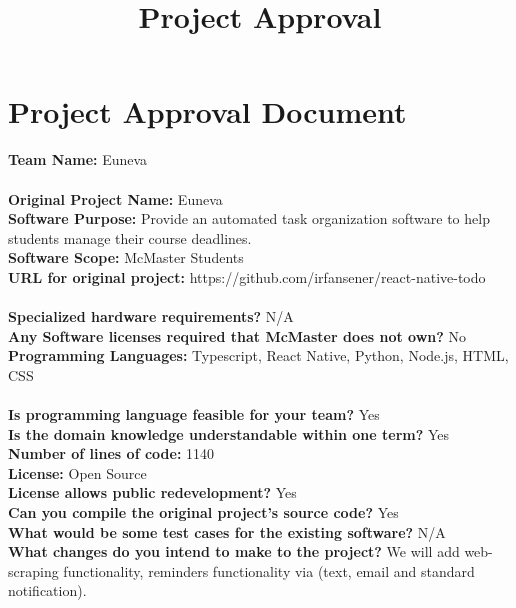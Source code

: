 \documentclass[11pt, oneside]{article}   	%
\title{Project Approval}
\author{}
\begin{document}
\marginpar{}
\section*{Project Approval Document}
\textbf{Team Name:} Euneva\\
\\
\textbf{Original Project Name:} Euneva\\
\textbf{Software Purpose:} Provide an automated task organization software to help students manage their course deadlines.\\
\textbf{Software Scope:} McMaster Students\\
\textbf{URL for original project:} https://github.com/irfansener/react-native-todo\\
\\
\textbf{Specialized hardware requirements?} N/A\\
\textbf{Any Software licenses required that McMaster does not own?} No\\
\textbf{Programming Languages:} Typescript, React Native, Python, Node.js, HTML, CSS\\
\\
\textbf{Is programming language feasible for your team?} Yes\\
\textbf{Is the domain knowledge understandable within one term?} Yes\\
\textbf{Number of lines of code:} 1140\\
\textbf{License:} Open Source\\
\textbf{License allows public redevelopment?} Yes\\
\textbf{Can you compile the original project's source code?} Yes\\
\textbf{What would be some test cases for the existing software?} N/A\\
\textbf{What changes do you intend to make to the project?} We will add web-scraping functionality, reminders functionality via (text, email and standard notification).\\
\end{document}
